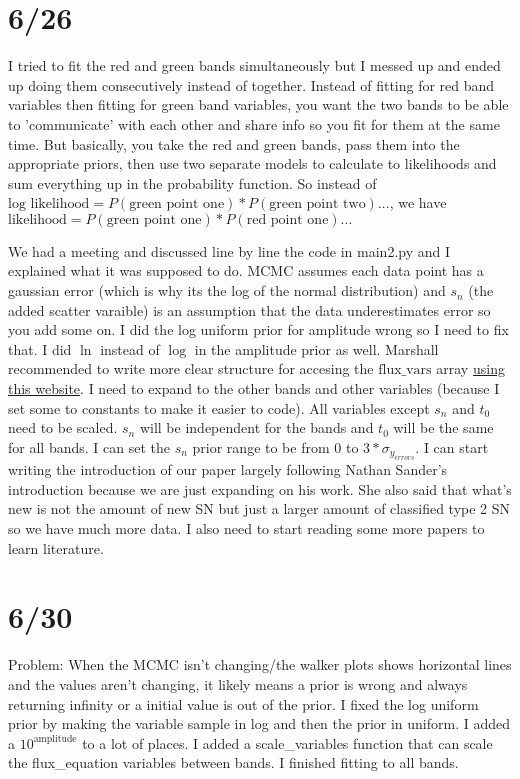 \documentclass[12pt]{article}
\begin{document}
\section{6/26}
I tried to fit the red and green bands simultaneously but I messed up and ended up doing them consecutively instead of together. Instead of fitting for red band variables then fitting for green band variables, you want the two bands to be able to 'communicate' with each other and share info so you fit for them at the same time. But basically, you take the red and green bands, pass them into the appropriate priors, then use two separate models to calculate to likelihoods and sum everything up in the probability function. So instead of $\text{log likelihood} = P(\text{green point one}) * P(\text{green point two})...$, we have $\text{likelihood} = P(\text{green point one}) * P(\text{red point one})...$

We had a meeting and discussed line by line the code in main2.py and I explained what it was supposed to do. MCMC assumes each data point has a gaussian error (which is why its the log of the normal distribution) and $s_n$ (the added scatter varaible) is an assumption that the data underestimates error so you add some on. I did the log uniform prior for amplitude wrong so I need to fix that. I did $\ln$ instead of $\log$ in the amplitude prior as well. Marshall recommended to write more clear structure for accesing the $\text{flux\_vars}$ array \href{https://stackoverflow.com/questions/35988/c-like-structures-in-python}{using this website}. I need to expand to the other bands and other variables (because I set some to constants to make it easier to code). All variables except $s_n$ and $t_0$ need to be scaled. $s_n$ will be independent for the bands and $t_0$ will be the same for all bands. I can set the $s_n$ prior range to be from $0$ to $3 * \sigma_{y_{errors}}$. I can start writing the introduction of our paper largely following Nathan Sander's introduction because we are just expanding on his work. She also said that what's new is not the amount of new SN but just a larger amount of classified type 2 SN so we have much more data. I also need to start reading some more papers to learn literature. 

\section{6/30}
Problem: When the MCMC isn't changing/the walker plots shows horizontal lines and the values aren't changing, it likely means a prior is wrong and always returning infinity or a initial value is out of the prior. I fixed the log uniform prior by making the variable sample in log and then the prior in uniform. I added a $10 ^{\text{amplitude}}$ to a lot of places. I added a scale\_variables function that can scale the flux\_equation variables between bands. I finished fitting to all bands. 
\end{document}
